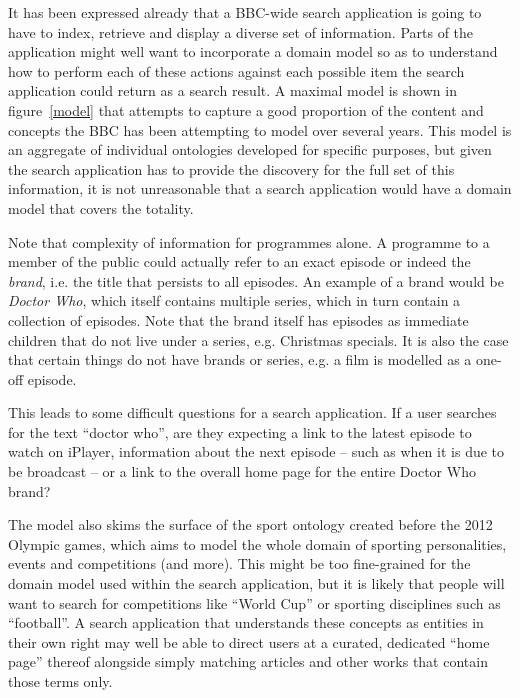 \documentclass[a4paper]{report}
\begin{document}
It has been expressed already that a BBC-wide search application
is going to have to index, retrieve and display a diverse set of
information. Parts of the application might well want to incorporate
a domain model \cite{fowler2002patterns} so as to understand how
to perform each of these actions against each possible item
the search application could return as a search result. A maximal
model is shown in figure~\ref{model} that attempts to capture
a good proportion of the content and concepts the BBC has
been attempting to model over several years. This model is
an aggregate of individual ontologies developed for specific purposes,
but given the search application has to provide the discovery for
the full set of this information, it is not unreasonable that
a search application would have a domain model that covers the totality.

Note that complexity of information for programmes alone. \cite{raimond2009bbc}
A programme to a member of the public could actually refer to an
exact episode or indeed the \emph{brand}, i.e. the title that
persists to all episodes. An example of a brand would be
\emph{Doctor Who}, which itself contains multiple series, which in turn
contain a collection of episodes. Note that the brand itself has episodes
as immediate children that do not live under a series, e.g. Christmas specials.
It is also the case that certain things do not have brands or series, e.g.
a film is modelled as a one-off episode.

This leads to some difficult questions for a search application. If a user
searches for the text ``doctor who'', are they expecting a link to the
latest episode to watch on iPlayer, information about the next episode
-- such as when it is due to be broadcast -- or a link to the overall
home page for the entire Doctor Who brand?

The model also skims the surface of the sport ontology \cite{rayfield2011bbc}
created before the 2012 Olympic games, which aims to model the whole domain
of sporting personalities, events and competitions (and more). This might
be too fine-grained for the domain model used within the search application,
but it is likely that people will want to search for competitions like
``World Cup'' or sporting disciplines such as ``football''. A search application
that understands these concepts as entities in their own right may well
be able to direct users at a curated, dedicated ``home page'' thereof alongside
simply matching articles and other works that contain those terms only.
\end{document}
